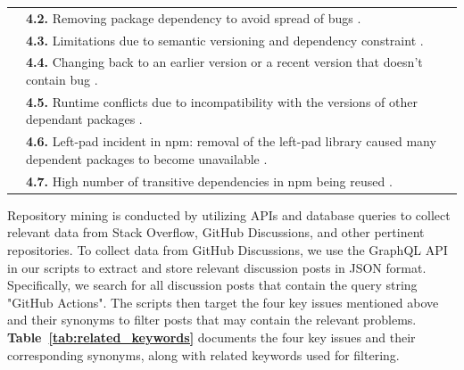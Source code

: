 \documentclass[conference]{IEEEtran}
\begin{document}
\begin{table}[!t]
\begin{tabular}{|p{3cm}|p{14cm}|}
						     & \textbf{4.2.} Removing package dependency to avoid spread of bugs \cite{decan2018impact} . \\	
						     & \textbf{4.3.} Limitations due to semantic versioning and dependency constraint \cite{decan2018impact}.\\
						     & \textbf{4.4.} Changing back to an earlier version or a recent version that doesn’t contain bug \cite{decan2018impact}  .\\
						     & \textbf{4.5.} Runtime conflicts due to incompatibility with
the versions of other dependant packages \cite{dietrich2019dependency}.
 \\
						     & \textbf{4.6.} Left-pad incident in npm: removal of the left-pad library caused many dependent packages to become unavailable \cite{zimmermann2019small}.  \\
						     & \textbf{4.7.} High number of transitive dependencies in npm  being reused \cite{zimmermann2019small}.  \\
        \hline
    \end{tabular}
\end{table}
             Repository mining is conducted by utilizing APIs and database queries to collect relevant data from Stack Overflow, GitHub Discussions, and other pertinent repositories. To collect data from GitHub Discussions, we use the GraphQL API in our scripts \cite{Marof2024} to extract and store relevant discussion posts in JSON format. Specifically, we search for all discussion posts that contain the query string "GitHub Actions". The scripts then target the four key issues mentioned above and their synonyms to filter posts that may contain the relevant problems. \textbf{Table~\ref{tab:related_keywords}} documents the four key issues and their corresponding synonyms, along with related keywords used for filtering. \\
\end{document}
